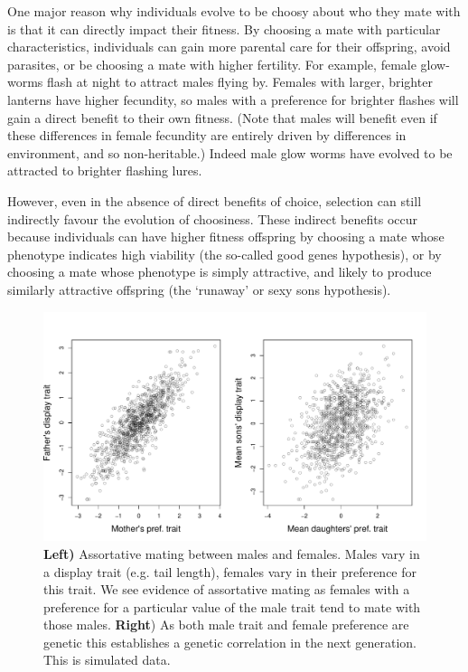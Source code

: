 One major reason why individuals evolve to be choosy about who they mate with is that it can directly impact their fitness. By choosing a mate with
particular characteristics, individuals can gain more parental care for
their offspring, avoid parasites, or be choosing a mate with higher fertility. For example,  female glow-worms flash at night to attract males flying by. Females with larger, brighter lanterns have higher fecundity, so
males with a preference for brighter flashes will gain a direct benefit to their own fitness. (Note that males will benefit even if these differences in female fecundity are entirely driven by differences in environment, and so non-heritable.) Indeed male glow worms have evolved to be attracted to brighter
flashing lures.  

However, even in the absence of direct benefits of choice, selection can still indirectly favour the evolution of choosiness. These
indirect benefits occur because individuals can have higher fitness
offspring by choosing a mate whose phenotype indicates high viability
(the so-called good genes hypothesis), or by choosing a mate whose
phenotype is simply attractive, and likely to produce similarly
attractive offspring (the `runaway' or sexy sons hypothesis).

\begin{figure}
\begin{center}
\includegraphics[width=\textwidth]{figures/Response_to_sel/Genetic_corr_assort_mating.pdf}
\end{center} \label{fig:assort_mating_2_trait}
\caption{{\bf Left)} Assortative mating between males and
  females. Males vary in a display trait (e.g. tail length), females
  vary in their preference for this trait. We see evidence of
  assortative mating as females with a preference for a particular
  value of the male trait tend to mate with those males. {\bf Right}) As both
  male trait and female preference are genetic this establishes a
  genetic correlation in the next generation. This is simulated data. } \label{fig:assort_mating_2_trait}
\end{figure}


